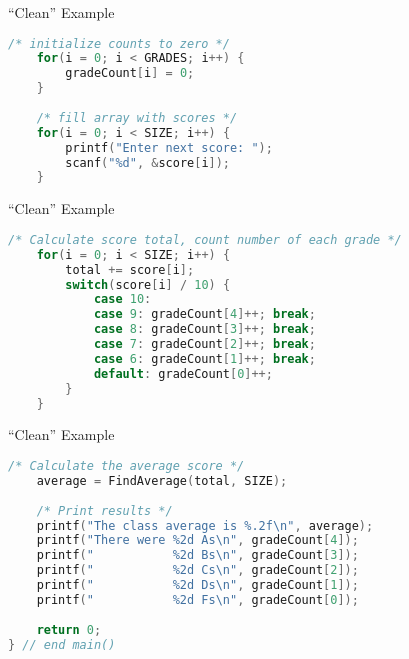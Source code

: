\documentclass[graphics]{beamer}
\begin{document}
\begin{frame}[fragile]{``Clean'' Example}
    \begin{lstlisting}[language=C,basicstyle=\footnotesize,keywordstyle=\color{blue},commentstyle=\color{green},showstringspaces=false,stringstyle=\color{red}]
    /* initialize counts to zero */
    for(i = 0; i < GRADES; i++) {
        gradeCount[i] = 0;
    }
    
    /* fill array with scores */
    for(i = 0; i < SIZE; i++) {
        printf("Enter next score: ");
        scanf("%d", &score[i]);
    }
    \end{lstlisting}
\end{frame}

\begin{frame}[fragile]{``Clean'' Example}
    \begin{lstlisting}[language=C,basicstyle=\footnotesize,keywordstyle=\color{blue},commentstyle=\color{green},showstringspaces=false,stringstyle=\color{red}]
    /* Calculate score total, count number of each grade */
    for(i = 0; i < SIZE; i++) {
        total += score[i];
        switch(score[i] / 10) {
            case 10:
            case 9: gradeCount[4]++; break;
            case 8: gradeCount[3]++; break;
            case 7: gradeCount[2]++; break;
            case 6: gradeCount[1]++; break;
            default: gradeCount[0]++;
        }
    }
    \end{lstlisting}
\end{frame}

\begin{frame}[fragile]{``Clean'' Example}
    \begin{lstlisting}[language=C,basicstyle=\footnotesize,keywordstyle=\color{blue},commentstyle=\color{green},showstringspaces=false,stringstyle=\color{red}]
    /* Calculate the average score */
    average = FindAverage(total, SIZE);
    
    /* Print results */
    printf("The class average is %.2f\n", average);
    printf("There were %2d As\n", gradeCount[4]);
    printf("           %2d Bs\n", gradeCount[3]);
    printf("           %2d Cs\n", gradeCount[2]);
    printf("           %2d Ds\n", gradeCount[1]);
    printf("           %2d Fs\n", gradeCount[0]);
    
    return 0;
} // end main()
    \end{lstlisting}
\end{frame}
\end{document}
